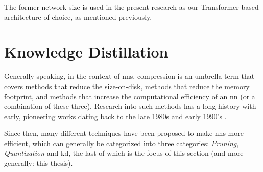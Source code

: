 The former network size is used in the present research as our Transformer-based architecture of choice, as mentioned previously.



\section{Knowledge Distillation}
\label{sec:knowledge_distillation}
Generally speaking, in the context of \glspl{nn}, compression is an umbrella term that covers methods that reduce the size-on-disk, methods that reduce the memory footprint, and methods that increase the computational efficiency of an \gls{nn} (or a combination of these three).  Research into such methods has a long history with early, pioneering works dating back to the late 1980s \citep{janowsky1989pruning,mozer1989skeletonization} and early 1990's \citep{lecun1990optimal,hassibi1993second}. 

Since then, many different techniques have been proposed to make \glspl{nn} more efficient, which can generally be categorized into three categories: \emph{Pruning}, \emph{Quantization} and \gls{kd}, the last of which is the focus of this section (and more generally: this thesis).


